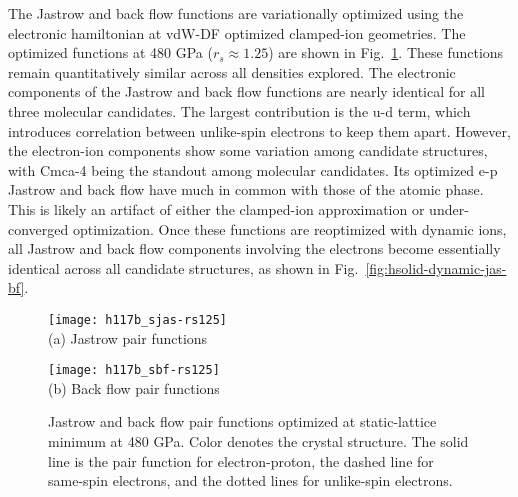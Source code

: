 The Jastrow and back flow functions are variationally optimized using the electronic hamiltonian at vdW-DF optimized clamped-ion geometries. The optimized functions at 480 GPa ($r_s\approx 1.25$) are shown in Fig.~\ref{fig:hsolid-static-jas-bf}.
These functions remain quantitatively similar across all densities explored.
The electronic components of the Jastrow and back flow functions are nearly identical for all three molecular candidates.
The largest contribution is the u-d term, which introduces correlation between unlike-spin electrons to keep them apart.
However, the electron-ion components show some variation among candidate structures, with Cmca-4 being the standout among molecular candidates.
Its optimized e-p Jastrow and back flow have much in common with those of the atomic phase.
This is likely an artifact of either the clamped-ion approximation or under-converged optimization. Once these functions are reoptimized with dynamic ions, all Jastrow and back flow components involving the electrons become essentially identical across all candidate structures, as shown in Fig.~\ref{fig:hsolid-dynamic-jas-bf}.

\begin{figure}[h]
\centering
\begin{minipage}{0.49\textwidth}
\centering
\texttt{[image: h117b\_sjas-rs125]}\\
(a) Jastrow pair functions
\end{minipage}
\begin{minipage}{0.49\textwidth}
\centering
\texttt{[image: h117b\_sbf-rs125]}\\
(b) Back flow pair functions
\end{minipage}
\caption{Jastrow and back flow pair functions optimized at static-lattice minimum at 480 GPa. Color denotes the crystal structure. The solid line is the pair function for electron-proton, the dashed line for same-spin electrons, and the dotted lines for unlike-spin electrons.}
\label{fig:hsolid-static-jas-bf}
\end{figure}

